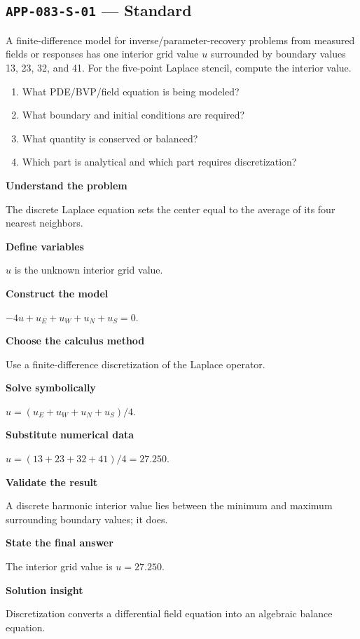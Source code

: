 \documentclass[11pt]{book}
\newcommand{\pid}[1]{\texttt{#1}}
\begin{document}
\subsection*{\pid{APP-083-S-01} — Standard}
\begin{problembox}
A finite-difference model for inverse/parameter-recovery problems from measured fields or responses has one interior grid value $u$ surrounded by boundary values 13, 23, 32, and 41. For the five-point Laplace stencil, compute the interior value.
\end{problembox}
\begin{promptbox}\begin{enumerate}
\item What PDE/BVP/field equation is being modeled?
\item What boundary and initial conditions are required?
\item What quantity is conserved or balanced?
\item Which part is analytical and which part requires discretization?
\end{enumerate}\end{promptbox}
\begin{solutionbox}
\textbf{Understand the problem}\par The discrete Laplace equation sets the center equal to the average of its four nearest neighbors.\par\medskip
\textbf{Define variables}\par $u$ is the unknown interior grid value.\par\medskip
\textbf{Construct the model}\par $-4u+u_E+u_W+u_N+u_S=0$.\par\medskip
\textbf{Choose the calculus method}\par Use a finite-difference discretization of the Laplace operator.\par\medskip
\textbf{Solve symbolically}\par $u=(u_E+u_W+u_N+u_S)/4$.\par\medskip
\textbf{Substitute numerical data}\par $u=(13+23+32+41)/4=27.250$.\par\medskip
\textbf{Validate the result}\par A discrete harmonic interior value lies between the minimum and maximum surrounding boundary values; it does.\par\medskip
\textbf{State the final answer}\par The interior grid value is $u=27.250$.\par\medskip
\textbf{Solution insight}\par Discretization converts a differential field equation into an algebraic balance equation.\par\medskip
\end{solutionbox}
\end{document}
